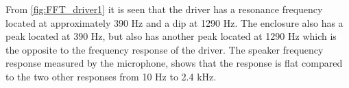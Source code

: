 %	
%	
%	

From \autoref{fig:FFT_driver1} it is seen that the driver has a resonance frequency located at approximately 390 Hz and a dip at 1290 Hz. The enclosure also has a peak located at 390 Hz, but also has another peak located at 1290 Hz which is the opposite to the frequency response of the driver. The speaker frequency response measured by the microphone, shows that the response is flat compared to the two other responses from 10 Hz to 2.4 kHz.

%	
%	
%	

